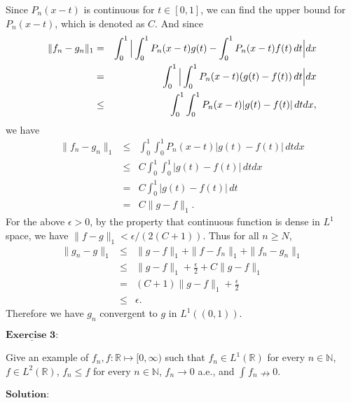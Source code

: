 \documentclass[12pt,a4paper]{ctexart}
\begin{document}
 Since $P_{n}(x-t)$ is continuous for $t \in [0, 1]$, we can find the upper bound for  $P_{n}(x-t)$, which is denoted as $C$. And since
\begin{eqnarray*}
\|f_{n}- g_{n} \|_{1} &=& \int_{0}^{1} \Big{|} \int_{0}^{1}  P_{n}(x-t) g(t) - \int_{0}^{1}  P_{n}(x-t) f(t) \, d t \Big{|} d x  \\
&=& \int_{0}^{1} \Big{|} \int_{0}^{1}  P_{n}(x-t) (g(t) - f(t)) \, d t \Big{|} d x  \\
&\leq& \int_{0}^{1}  \int_{0}^{1}  P_{n}(x-t) |g(t) - f(t)|\, d t  d x,
\end{eqnarray*}
we have
\begin{eqnarray*}
\|f_{n}- g_{n} \|_{1} &\leq&  \int_{0}^{1}  \int_{0}^{1}  P_{n}(x-t) |g(t) - f(t)|\, d t  d x \\
&\leq&  C \int_{0}^{1}  \int_{0}^{1} |g(t) - f(t)|\, d t  d x \\
&=&  C \int_{0}^{1} |g(t) - f(t)|\, d t \\
&=& C \|g-f \|_{1}.
\end{eqnarray*}
For the above $\epsilon > 0$, by the property that continuous function is dense in $L^{1}$ space, we have $\|f- g \|_{1} < \epsilon/(2(C+1))$. Thus for all $n \geq N$,
\begin{eqnarray*}
\| g_{n}  -g \|_{1} &\leq&  \|g- f \|_{1} + \|f- f_{n} \|_{1} + \|f_{n}- g_{n} \|_{1} \\
&\leq&  \|g- f \|_{1} + \frac{\epsilon}{2} + C \|g - f \|_1 \\
&=& (C+1) \|g - f \|_1 + \frac{\epsilon}{2}  \\
& \leq & \epsilon.
\end{eqnarray*}
Therefore we have $g_{n}$ convergent to $g$ in $L^{1}((0, 1))$.


\newpage


$\underline{\textbf{Exercise 3:}}$

Give an example of $f_n, f : \mathbb{R} \mapsto [0, \infty)$ such that $f_{n} \in L^{1}(\mathbb{R})$ for every $n \in \mathbb{N}$, $f \in L^{2}(\mathbb{R})$, $f_{n} \leq f$ for every $n \in \mathbb{N}$, $f_{n} \to 0$ a.e., and $\int_{}^{} f_{n} \nrightarrow 0$.

\vspace{8pt}
$\textbf{Solution:}$
\end{document}
